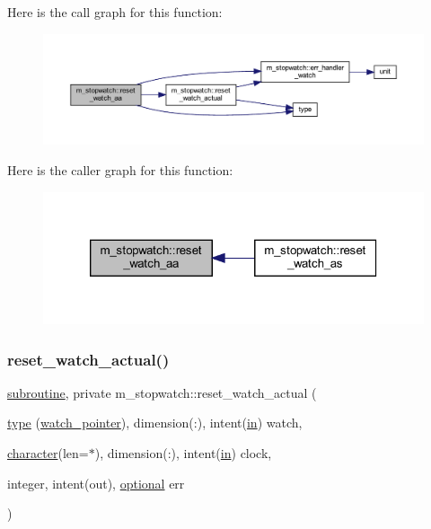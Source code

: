 Here is the call graph for this function\+:
\nopagebreak
\begin{figure}[H]
\begin{center}
\leavevmode
\includegraphics[width=350pt]{namespacem__stopwatch_ab6cfebb215292cc061f472aedb2dbb93_cgraph}
\end{center}
\end{figure}
Here is the caller graph for this function\+:
\nopagebreak
\begin{figure}[H]
\begin{center}
\leavevmode
\includegraphics[width=320pt]{namespacem__stopwatch_ab6cfebb215292cc061f472aedb2dbb93_icgraph}
\end{center}
\end{figure}
\mbox{\label{namespacem__stopwatch_a70b2f142c88aae3054e06c0884197de2}} 
\subsubsection{\texorpdfstring{reset\+\_\+watch\+\_\+actual()}{reset\_watch\_actual()}}
{\footnotesize\ttfamily \hyperlink{M__stopwatch_83_8txt_acfbcff50169d691ff02d4a123ed70482}{subroutine}, private m\+\_\+stopwatch\+::reset\+\_\+watch\+\_\+actual (\begin{DoxyParamCaption}\item[{\hyperlink{stop__watch_83_8txt_a70f0ead91c32e25323c03265aa302c1c}{type} (\hyperlink{structm__stopwatch_1_1watch__pointer}{watch\+\_\+pointer}), dimension(\+:), intent(\hyperlink{M__journal_83_8txt_afce72651d1eed785a2132bee863b2f38}{in})}]{watch,  }\item[{\hyperlink{option__stopwatch_83_8txt_abd4b21fbbd175834027b5224bfe97e66}{character}(len=$\ast$), dimension(\+:), intent(\hyperlink{M__journal_83_8txt_afce72651d1eed785a2132bee863b2f38}{in})}]{clock,  }\item[{integer, intent(out), \hyperlink{option__stopwatch_83_8txt_aa4ece75e7acf58a4843f70fe18c3ade5}{optional}}]{err }\end{DoxyParamCaption})\hspace{0.3cm}{\ttfamily [private]}}



